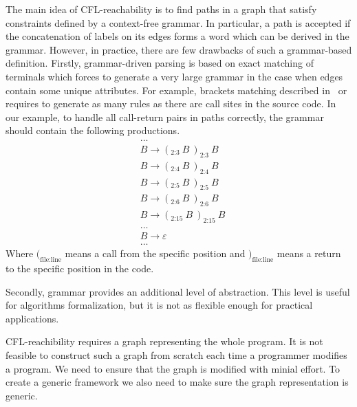 The main idea of CFL-reachability is to find paths in a graph that satisfy constraints defined by a context-free grammar.
In particular, a path is accepted if the concatenation of labels on its edges forms a word which can be derived in the grammar.
However, in practice, there are few drawbacks of such a grammar-based definition.
Firstly, grammar-driven parsing is based on exact matching of terminals which forces to generate a very large grammar in the case when edges contain some unique attributes.
For example, brackets matching described in~\cite{CFLr} or~\cite{Zheng, JavaCFL} requires to generate as many rules as there are call sites in the source code.
In our example, to handle all call-return pairs in paths correctly, the grammar should contain the following productions.
\begin{equation}
	\begin{split}
		& \ldots \\
		& B \rightarrow (_\text{2:3}\ B\  )_\text{2:3}\ B \\
		& B \rightarrow (_\text{2:4}\ B\  )_\text{2:4}\ B \\
		& B \rightarrow (_\text{2:5}\ B\  )_\text{2:5}\ B \\
		& B \rightarrow (_\text{2:6}\ B\  )_\text{2:6}\ B \\
		& B \rightarrow (_\text{2:15}\ B\ )_\text{2:15}\ B \\
		& \ldots \\
		& B \rightarrow \varepsilon \\
		& \ldots
	\end{split}
\end{equation}
Where $(_{\text{file}:\text{line}}$ means a call from the specific position and $)_{\text{file}:\text{line}}$ means a return to the specific position in the code.

Secondly, grammar provides an additional level of abstraction.
This level is useful for algorithms formalization, but it is not as flexible enough for practical applications.

CFL-reachibility requires a graph representing the whole program.
It is not feasible to construct such a graph from scratch each time a programmer modifies a program.
We need to ensure that the graph is modified with minial effort.
To create a generic framework we also need to make sure the graph representation is generic.

